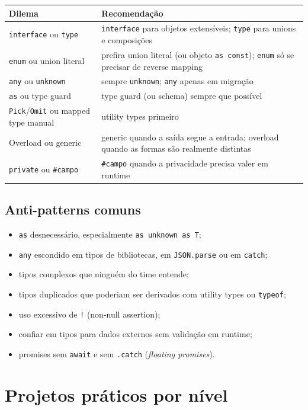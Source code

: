 \documentclass[12pt,a4paper,oneside]{book}
\newcommand{\code}[1]{\texttt{#1}}
\begin{document}
{\small
\begin{tabularx}{\textwidth}{@{}lX@{}}
\toprule
\textbf{Dilema} & \textbf{Recomendação} \\
\midrule
\code{interface} ou \code{type} & \code{interface} para objetos extensíveis; \code{type} para unions e composições \\
\code{enum} ou union literal & prefira union literal (ou objeto \code{as const}); \code{enum} só se precisar de reverse mapping \\
\code{any} ou \code{unknown} & sempre \code{unknown}; \code{any} apenas em migração \\
\code{as} ou type guard & type guard (ou schema) sempre que possível \\
\code{Pick}/\code{Omit} ou mapped type manual & utility types primeiro \\
Overload ou generic & generic quando a saída segue a entrada; overload quando as formas são realmente distintas \\
\code{private} ou \code{\#campo} & \code{\#campo} quando a privacidade precisa valer em runtime \\
\bottomrule
\end{tabularx}
}

\section{Anti-patterns comuns}

\begin{itemize}
  \item \code{as} desnecessário, especialmente \code{as unknown as T};
  \item \code{any} escondido em tipos de bibliotecas, em \code{JSON.parse} ou em \code{catch};
  \item tipos complexos que ninguém do time entende;
  \item tipos duplicados que poderiam ser derivados com utility types ou \code{typeof};
  \item uso excessivo de \code{!} (non-null assertion);
  \item confiar em tipos para dados externos sem validação em runtime;
  \item promises sem \code{await} e sem \code{.catch} (\emph{floating promises}).
\end{itemize}

\chapter{Projetos práticos por nível}
\label{cap:projetos}
\end{document}
